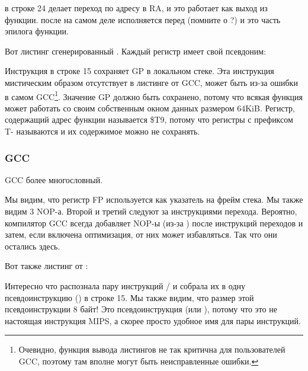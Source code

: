  в строке 24 делает переход по адресу в \ac{RA}, и это работает как выход из функции.
 после  на самом деле исполняется перед  (помните о ?) 
и это часть эпилога функции.

Вот листинг сгенерированный \IDA. Каждый регистр имеет свой псевдоним:



Инструкция в строке 15 сохраняет GP в локальном стеке. Эта инструкция мистическим образом отсутствует
в листинге от GCC, может быть из-за ошибки в самом GCC\footnote{Очевидно, функция вывода листингов не так критична
для пользователей GCC, поэтому там вполне могут быть неисправленные ошибки.}.
Значение GP должно быть сохранено, потому что всякая функция может работать со своим собственным окном данных
размером 64KiB.
Регистр, содержащий адрес функции \puts называется \$T9, потому что регистры с префиксом T- называются
 и их содержимое можно не сохранять.

\subsubsection{\NonOptimizing GCC}

\NonOptimizing GCC более многословный.



Мы видим, что регистр FP используется как указатель на фрейм стека.
Мы также видим 3 \ac{NOP}-а.
Второй и третий следуют за инструкциями перехода.
Вероятно, компилятор GCC всегда добавляет \ac{NOP}-ы (из-за )
после инструкций переходов и затем, если включена оптимизация, от них может избавляться.
Так что они остались здесь.

Вот также листинг от \IDA:



Интересно что \IDA распознала пару инструкций / и собрала их в одну псевдоинструкцию 
 () в строке 15.
Мы также видим, что размер этой псевдоинструкции 8 байт!
Это псевдоинструкция (или ), потому что это не настоящая инструкция MIPS, а скорее
просто удобное имя для пары инструкций.

